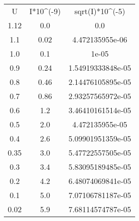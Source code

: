 \begin{table}
\begin{tabular}{ccc}
U & I*10^(-9) & sqrt(I)*10^(-5) \\
1.12 & 0.0 & 0.0 \\
1.1 & 0.02 & 4.472135955e-06 \\
1.0 & 0.1 & 1e-05 \\
0.9 & 0.24 & 1.54919333848e-05 \\
0.8 & 0.46 & 2.14476105895e-05 \\
0.7 & 0.86 & 2.93257565972e-05 \\
0.6 & 1.2 & 3.46410161514e-05 \\
0.5 & 2.0 & 4.472135955e-05 \\
0.4 & 2.6 & 5.09901951359e-05 \\
0.35 & 3.0 & 5.47722557505e-05 \\
0.3 & 3.4 & 5.83095189485e-05 \\
0.2 & 4.2 & 6.48074069841e-05 \\
0.1 & 5.0 & 7.07106781187e-05 \\
0.02 & 5.9 & 7.68114574787e-05 \\
\end{tabular}
\end{table}
